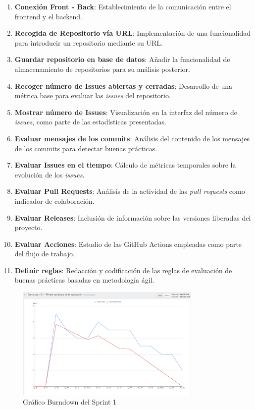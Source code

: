 \begin{enumerate}
\item \textbf{Conexión Front - Back}: Establecimiento de la comunicación entre el frontend y el backend.
\item \textbf{Recogida de Repositorio vía URL}: Implementación de una funcionalidad para introducir un repositorio mediante su URL.
\item \textbf{Guardar repositorio en base de datos}: Añadir la funcionalidad de almacenamiento de repositorios para su análisis posterior.
\item \textbf{Recoger número de Issues abiertas y cerradas}: Desarrollo de una métrica base para evaluar las \textit{issues} del repositorio.
\item \textbf{Mostrar número de Issues}: Visualización en la interfaz del número de \textit{issues}, como parte de las estadísticas presentadas.
\item \textbf{Evaluar mensajes de los commits}: Análisis del contenido de los mensajes de los commits para detectar buenas prácticas.
\item \textbf{Evaluar Issues en el tiempo}: Cálculo de métricas temporales sobre la evolución de los \textit{issues}.
\item \textbf{Evaluar Pull Requests}: Análisis de la actividad de las \textit{pull requests} como indicador de colaboración.
\item \textbf{Evaluar Releases}: Inclusión de información sobre las versiones liberadas del proyecto.
\item \textbf{Evaluar Acciones}: Estudio de las GitHub Actions empleadas como parte del flujo de trabajo.
\item \textbf{Definir reglas}: Redacción y codificación de las reglas de evaluación de buenas prácticas basadas en metodología ágil.
\end{enumerate}

\begin{figure}[H]
\centering
\includegraphics[width=0.8\textwidth]{img/BurndownS1.png}
\caption{Gráfico Burndown del Sprint 1}
\label{fig:BurndownS1}
\end{figure}


